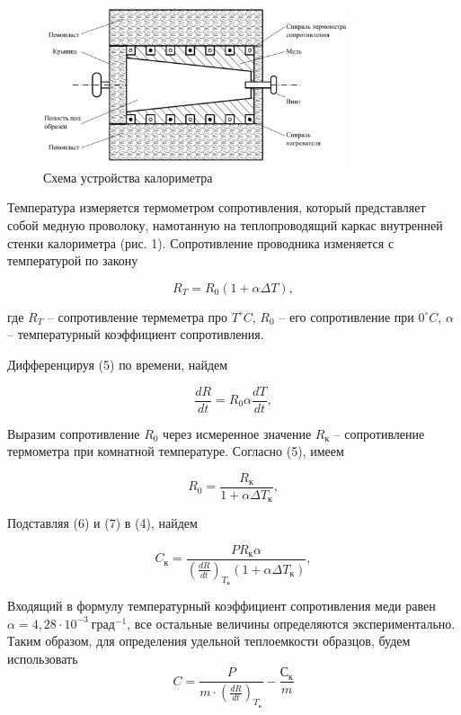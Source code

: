 \documentclass[12pt,a4paper]{article}
\begin{document}
\begin{figure}[h]
	\centering
	\includegraphics[width=0.8\textwidth]{pic1.png}
	\caption{Схема устройства калориметра}
	\label{fig:calorimeter}
\end{figure}

Температура измеряется термометром сопротивления, который представляет собой медную проволоку, намотанную на теплопроводящий каркас внутренней стенки калориметра (рис. 1). Сопротивление проводника изменяется с температурой по закону

\begin{equation}
    R_{T} = R_{0}(1 + \alpha \Delta T),
    \label{RT}
\end{equation}

где $R_{T}$ -- сопротивление термеметра про $T  ^{\circ}C$, $R_{0}$ -- его сопротивление при $0  ^{\circ}C$, $\alpha$ -- температурный коэффициент сопротивления. 

Дифференцируя (5) по времени, найдем

\begin{equation}
    \frac{dR}{dt} = R_{0}\alpha \frac{dT}{dt},
    \label{dRT}
\end{equation}

Выразим сопротивление $R_{0}$ через исмеренное значение $R_{\text{к}}$ -- сопротивление термометра при комнатной температуре. Согласно (5), имеем

\begin{equation}
    R_{0} = \frac{R_{\text{к}}}{1 + \alpha \Delta T_{\text{к}}},
    \label{R0}
\end{equation}

Подставляя (6) и (7) в (4), найдем

\begin{equation}
    C_к = \frac{PR_{\text{к}} \alpha}{(\frac{dR}{dt})_{T_{\text{к}}}(1 + \alpha \Delta T_{\text{к}})},
    \label{capacity}
\end{equation}
 
 Входящий в формулу температурный коэффициент сопротивления меди равен $\alpha = 4,28 \cdot 10^{-3}~\text{град}^{-1}$, все остальные величины определяются экспериментально.
 Таким образом, для определения удельной теплоемкости образцов, будем использовать
\begin{equation}
 C = \frac{P}{m\cdot(\frac{dR}{dt})_{T_{\text{к}}}}- \frac{С_к}{m}
 \end{equation}
 
\end{document}
